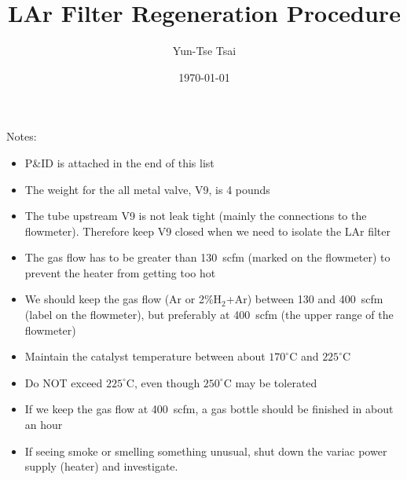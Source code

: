 \documentclass[letterpaper,11pt]{article}
\begin{document}
\title{\textbf{LAr Filter Regeneration Procedure}}
\author{Yun-Tse Tsai}
\date{\today}

\maketitle


Notes:
\begin{itemize}
\setlength\itemsep{-0.2em}
\item P\&ID is attached in the end of this list
\item The weight for the all metal valve, V9, is 4 pounds
\item The tube upstream V9 is not leak tight (mainly the connections to the flowmeter).  Therefore keep V9 closed when we need to isolate the LAr filter
\item The gas flow has to be greater than 130~scfm (marked on the flowmeter) to prevent the heater from getting too hot
\item We should keep the gas flow (Ar or 2\%H$_2$+Ar) between 130 and 400~scfm (label on the flowmeter), but preferably at 400~scfm (the upper range of the flowmeter)
\item Maintain the catalyst temperature between about $170^\circ$C and
$225^\circ$C
\item Do NOT exceed $225^\circ$C, even though $250^\circ$C may be tolerated
\item If we keep the gas flow at 400~scfm, a gas bottle should be finished in about an hour
\item If seeing smoke or smelling something unusual, shut down the variac power supply (heater) and investigate.

\end{itemize}
\end{document}
